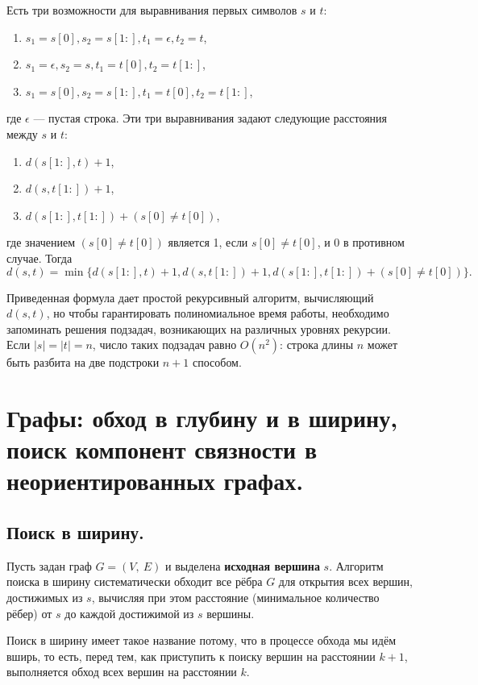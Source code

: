 \documentclass[a4paper,12pt]{article}
\begin{document}
Есть три возможности для выравнивания первых символов $s$ и $t$:
\begin{enumerate}
	\item $s_1 = s[0], s_2 = s[1:], t_1 = \epsilon, t_2 = t$,
	\item $s_1 = \epsilon, s_2 = s, t_1 = t[0], t_2 = t[1:]$,
	\item $s_1 = s[0], s_2 = s[1:], t_1 = t[0], t_2 = t[1:]$,
\end{enumerate}
где $\epsilon$ --- пустая строка.
Эти три выравнивания задают следующие расстояния между $s$ и $t$: 
\begin{enumerate}
	\item $d(s[1:], t) + 1$,
	\item $d(s, t[1:]) + 1$,
	\item $d(s[1:], t[1:]) + (s[0] \neq t[0])$,
\end{enumerate}
где значением $(s[0] \neq t[0])$ является 1, если $s[0] \neq t[0]$, и 0 в противном случае. Тогда
\[d(s, t) = \min\{d(s[1:], t) + 1, d(s, t[1:]) + 1, d(s[1:], t[1:]) + (s[0] \neq t[0])\}.\]

Приведенная формула дает простой рекурсивный алгоритм, вычисляющий $d(s, t)$, но чтобы гарантировать полиномиальное время работы, необходимо запоминать решения подзадач, возникающих на различных уровнях рекурсии. Если $|s| = |t| = n$, число таких подзадач равно $O(n^2)$: строка длины $n$ может быть разбита на две подстроки $n + 1$ способом.

\newpage
\section{Графы: обход в глубину и в ширину, поиск компонент связности в неориентированных графах.}

\subsection{Поиск в ширину.}

Пусть задан граф $G = (V,\ E)$ и выделена \textbf{исходная вершина} $s$. Алгоритм поиска в ширину систематически обходит все рёбра $G$ для открытия всех вершин, достижимых из $s$, вычисляя при этом расстояние (минимальное количество рёбер) от $s$ до каждой достижимой из $s$ вершины. 

Поиск в ширину имеет такое название потому, что в процессе обхода мы идём вширь, то есть, перед тем, как приступить к поиску вершин на расстоянии $k + 1$, выполняется обход всех вершин на расстоянии $k$.
\end{document}
